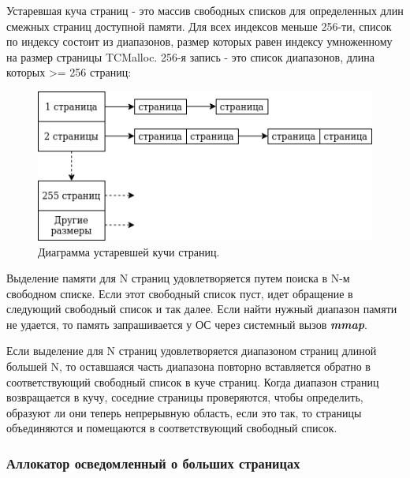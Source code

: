 Устаревшая куча страниц - это массив свободных списков для определенных длин смежных страниц доступной памяти. Для всех индексов меньше 256-ти, список по индексу состоит из диапазонов, размер которых равен индексу умноженному на размер страницы TCMalloc. 256-я запись - это список диапазонов, длина которых >= 256 страниц:

\begin{figure}[!h]
	\begin{center}
		\includegraphics[scale=0.6]{images/tcmalloc-legacy-pageheap.png}
		\caption{Диаграмма устаревшей кучи страниц.}
		\label{tcmalloc-legacy-pageheap}
	\end{center}
\end{figure}

Выделение памяти для N страниц удовлетворяется путем поиска в N-м свободном списке. Если этот свободный список пуст, идет обращение в следующий свободный список и так далее. Если найти нужный диапазон памяти не удается, то память запрашивается у ОС через системный вызов \textbf{\textit{mmap}}.

Если выделение для N страниц удовлетворяется диапазоном страниц длиной большей N, то оставшаяся часть диапазона повторно вставляется обратно в соответствующий свободный список в куче страниц. Когда диапазон страниц возвращается в кучу, соседние страницы проверяются, чтобы определить, образуют ли они теперь непрерывную область, если это так, то страницы объединяются и помещаются в соответствующий свободный список.

\subsubsection{Аллокатор осведомленный о больших страницах}

